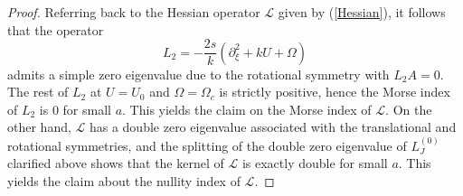 \documentclass[10pt,a4paper]{amsart}
\begin{document}
\begin{proof}
Referring back to the Hessian operator $\mathcal{L}$ given by (\ref{Hessian}), it follows that 
the operator 
$$
L_2 = -\frac{2s}{k} (\partial_{\xi}^2 + k U + \Omega)
$$ 
admits a simple zero eigenvalue due to the rotational symmetry with $L_2 A = 0$. The rest of $L_2$ at $U = U_0$ and $\Omega = \Omega_c$ is strictly positive, 
hence the Morse index of $L_2$ is $0$ for small $a$. This yields the claim on the Morse index of $\mathcal{L}$.
On the other hand, $\mathcal{L}$ has a double zero eigenvalue associated with the translational and rotational symmetries, and the splitting 
of the double zero eigenvalue of $L_J^{(0)}$ clarified above shows that the kernel of $\mathcal{L}$ is exactly double for small $a$. This yields the 
claim about the nullity index of $\mathcal{L}$.
\end{proof}
\end{document}
